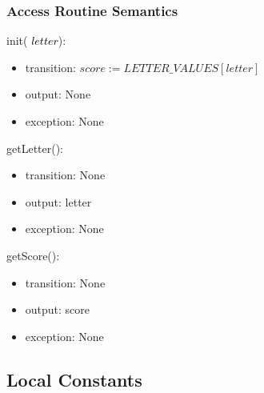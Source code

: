 \documentclass[12pt]{article}
\begin{document}
\subsubsection* {Access Routine Semantics}

\noindent init(\textcolor{black}{ $letter$}):
\begin{itemize}
\item transition: $score := LETTER\_VALUES[letter]$ 
\item output: None
\item exception: None
\end{itemize}

\noindent getLetter():
\begin{itemize}
\item transition: None
\item output: letter
\item exception: None
\end{itemize}

\noindent getScore():
\begin{itemize}
\item transition: None
\item output: score
\item exception: None
\end{itemize}

\subsection*{Local Constants}
\medskip
\newpage
\end{document}
